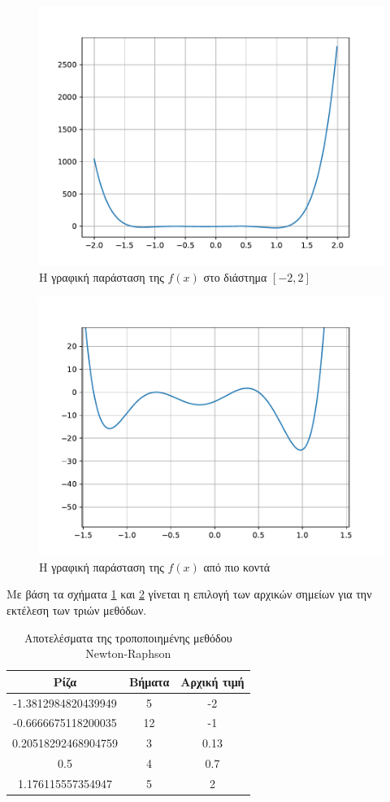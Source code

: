 \documentclass[a4paper,11pt]{article}
\newcommand{\lt}{\latintext}
\newcommand{\gt}{\greektext}
\begin{document}
\begin{figure}[H]
\centering
    \includegraphics[width=0.8\linewidth]{images/ask2_1.pdf}
    \centering
    \caption{Η γραφική παράσταση της \lt \(f(x)\) \gt στο διάστημα \([-2, 2]\)}
    \label{fig:2_1}
\end{figure}

\begin{figure}[H]
\centering
    \includegraphics[width=0.8\linewidth]{images/ask2_2.pdf}
    \centering
    \caption{Η γραφική παράσταση της \lt \(f(x)\) \gt από πιο κοντά}
    \label{fig:2_2}
\end{figure}

Με βάση τα σχήματα \ref{fig:2_1} και \ref{fig:2_2} γίνεται η επιλογή των αρχικών σημείων για την εκτέλεση των τριών μεθόδων.

\begin{table}[h]
\centering
\caption{Αποτελέσματα της τροποποιημένης μεθόδου \lt Newton-Raphson}
\label{fig:2_3}
\begin{tabular}{c c c}
    \gt Ρίζα & Βήματα & Αρχική τιμή \\ \hline
    -1.3812984820439949 & 5 & -2 \\
    -0.6666675118200035 & 12 & -1 \\
    0.20518292468904759 & 3 & 0.13 \\
    0.5 & 4 & 0.7 \\
    1.176115557354947 & 5 & 2 \\
\end{tabular}
\end{table}
\end{document}
